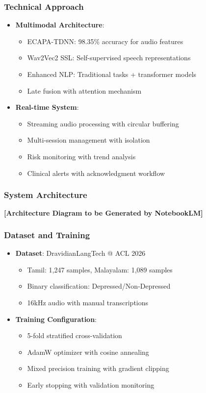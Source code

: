 \documentclass{beamer}
\begin{document}
\begin{frame}
\frametitle{Technical Approach}
\begin{itemize}
    \item \textbf{Multimodal Architecture}:
    \begin{itemize}
        \item ECAPA-TDNN: 98.35\% accuracy for audio features
        \item Wav2Vec2 SSL: Self-supervised speech representations
        \item Enhanced NLP: Traditional tasks + transformer models
        \item Late fusion with attention mechanism
    \end{itemize}
    \item \textbf{Real-time System}:
    \begin{itemize}
        \item Streaming audio processing with circular buffering
        \item Multi-session management with isolation
        \item Risk monitoring with trend analysis
        \item Clinical alerts with acknowledgment workflow
    \end{itemize}
\end{itemize}
\end{frame}

\begin{frame}
\frametitle{System Architecture}
\begin{center}
\textbf{[Architecture Diagram to be Generated by NotebookLM]}
\end{center}
\end{frame}

\begin{frame}
\frametitle{Dataset and Training}
\begin{itemize}
    \item \textbf{Dataset}: DravidianLangTech @ ACL 2026
    \begin{itemize}
        \item Tamil: 1,247 samples, Malayalam: 1,089 samples
        \item Binary classification: Depressed/Non-Depressed
        \item 16kHz audio with manual transcriptions
    \end{itemize}
    \item \textbf{Training Configuration}:
    \begin{itemize}
        \item 5-fold stratified cross-validation
        \item AdamW optimizer with cosine annealing
        \item Mixed precision training with gradient clipping
        \item Early stopping with validation monitoring
    \end{itemize}
\end{itemize}
\end{frame}
\end{document}

